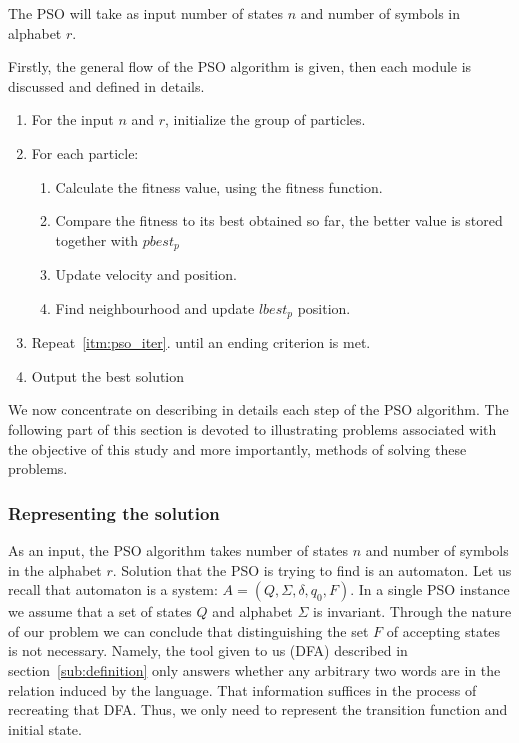 \documentclass{article}
\begin{document}
The PSO will take as input number of states $n$ and number of symbols in alphabet $r$.

Firstly, the general flow of the PSO algorithm is given, then each module is discussed and defined in details.

\begin{center}

\begin{enumerate}
	\item For the input $n$ and $r$, initialize the group of particles.

	\item For each particle: \label{itm:pso_iter}
	\begin{enumerate}
		\item Calculate the fitness value, using the fitness function.
		\item Compare the fitness to its best obtained so far, the better value is stored together with $pbest_p$	
		
		\item Update velocity and position.	
		
		\item Find neighbourhood and update $lbest_p$ position.
	\end{enumerate}		
	

	
	\item Repeat~\ref{itm:pso_iter}. until an ending criterion is met.

	\item Output the best solution	
	
\end{enumerate}

\end{center}

We now concentrate on describing in details each step of the PSO algorithm. The following part of this section is devoted to illustrating problems associated with the objective of this study and more importantly, methods of solving these problems.


\subsubsection{Representing the solution}
As an input, the PSO algorithm takes number of states $n$ and number of symbols in the alphabet $r$.
Solution that the PSO is trying to find is an automaton. Let us recall that automaton is a system: $A = (Q, \Sigma, \delta, q_0, F)$. In a single PSO instance we assume that a set of states $Q$ and alphabet $\Sigma$ is invariant. Through the nature of our problem we can conclude that distinguishing the set $F$ of accepting states is not necessary. Namely, the tool given to us (DFA) described in section~\ref{sub:definition} only answers whether any arbitrary two words are in the relation induced by the language. That information suffices in the process of recreating that DFA. Thus, we only need to represent the transition function and initial state.
\end{document}

